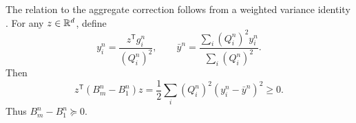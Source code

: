 The relation to the aggregate correction follows from a weighted variance
identity \cite{zhang2026pbsav}. For any \(z\in\mathbb{R}^d\), define
\begin{equation}
  y_i^n=\frac{z^{\mathsf T}g_i^n}{(Q_i^n)^2},
  \qquad
  \bar y^n=\frac{\sum_i(Q_i^n)^2y_i^n}{\sum_i(Q_i^n)^2}.
\end{equation}
Then
\begin{equation}
  z^{\mathsf T}(B_m^n-B_1^n)z
  =\frac12\sum_i(Q_i^n)^2(y_i^n-\bar y^n)^2\geq0.
  \label{eq:background-variance-gap}
\end{equation}
Thus \(B_m^n-B_1^n\succeq0\).
